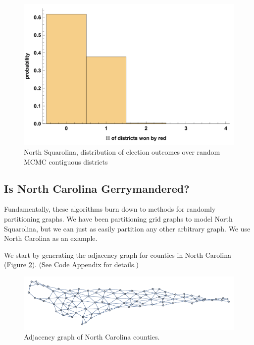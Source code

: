 \documentclass[12pt]{article}
\begin{document}
    \begin{figure}[h!]
    \centering
    \includegraphics[scale=0.5]{MCMC}
    \caption{North Squarolina, distribution of election outcomes over random MCMC contiguous districts}
    \label{fig:MCMC}
    \end{figure}








\subsection{Is North Carolina Gerrymandered?}
Fundamentally, these algorithms burn down to methods for randomly partitioning graphs. We have been partitioning grid graphs to model North Squarolina, but we can just as easily partition any other arbitrary graph. We use North Carolina as an example.
\par We start by generating the adjacency graph for counties in North Carolina (Figure \ref{fig:nc_adj}). (See Code Appendix for details.)

    \begin{figure}[h!]
    \centering
    \includegraphics[scale=0.7]{NC_adj_graph.pdf}
    \caption{Adjacency graph of North Carolina counties.}
    \label{fig:nc_adj}
    \end{figure}
    
\end{document}
